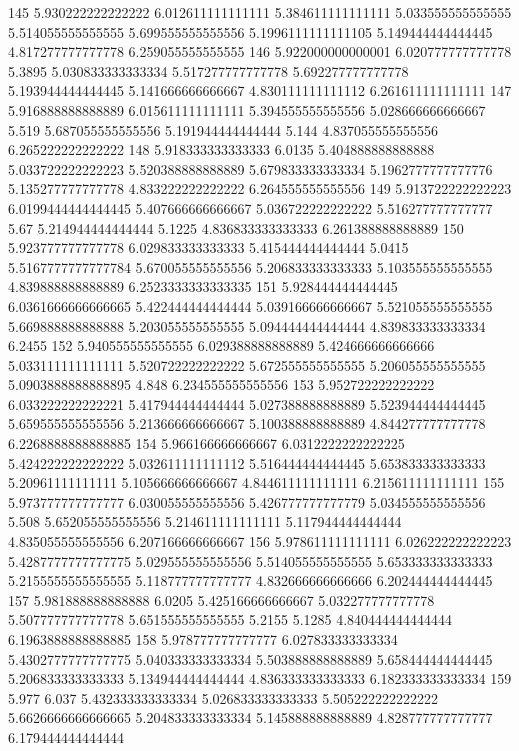 145 5.930222222222222 6.012611111111111 5.384611111111111 5.033555555555555 5.514055555555555 5.699555555555556 5.1996111111111105 5.149444444444445 4.817277777777778 6.259055555555555
146 5.922000000000001 6.020777777777778 5.3895 5.030833333333334 5.517277777777778 5.692277777777778 5.193944444444445 5.141666666666667 4.830111111111112 6.261611111111111
147 5.916888888888889 6.015611111111111 5.394555555555556 5.028666666666667 5.519 5.687055555555556 5.191944444444444 5.144 4.837055555555556 6.265222222222222
148 5.918333333333333 6.0135 5.404888888888888 5.033722222222223 5.520388888888889 5.679833333333334 5.1962777777777776 5.135277777777778 4.833222222222222 6.264555555555556
149 5.913722222222223 6.0199444444444445 5.407666666666667 5.036722222222222 5.516277777777777 5.67 5.214944444444444 5.1225 4.836833333333333 6.261388888888889
150 5.923777777777778 6.029833333333333 5.415444444444444 5.0415 5.5167777777777784 5.670055555555556 5.206833333333333 5.103555555555555 4.839888888888889 6.2523333333333335
151 5.928444444444445 6.0361666666666665 5.422444444444444 5.039166666666667 5.521055555555555 5.669888888888888 5.203055555555555 5.094444444444444 4.839833333333334 6.2455
152 5.940555555555555 6.029388888888889 5.424666666666666 5.033111111111111 5.520722222222222 5.672555555555555 5.206055555555555 5.0903888888888895 4.848 6.234555555555556
153 5.952722222222222 6.033222222222221 5.417944444444444 5.027388888888889 5.523944444444445 5.659555555555556 5.213666666666667 5.100388888888889 4.844277777777778 6.2268888888888885
154 5.966166666666667 6.0312222222222225 5.424222222222222 5.032611111111112 5.516444444444445 5.653833333333333 5.20961111111111 5.105666666666667 4.844611111111111 6.215611111111111
155 5.973777777777777 6.030055555555556 5.426777777777779 5.034555555555556 5.508 5.652055555555556 5.214611111111111 5.117944444444444 4.835055555555556 6.207166666666667
156 5.978611111111111 6.026222222222223 5.4287777777777775 5.029555555555556 5.514055555555555 5.653333333333333 5.2155555555555555 5.118777777777777 4.832666666666666 6.202444444444445
157 5.981888888888888 6.0205 5.425166666666667 5.032277777777778 5.507777777777778 5.651555555555555 5.2155 5.1285 4.840444444444444 6.1963888888888885
158 5.978777777777777 6.027833333333334 5.4302777777777775 5.040333333333334 5.503888888888889 5.658444444444445 5.206833333333333 5.134944444444444 4.836333333333333 6.182333333333334
159 5.977 6.037 5.432333333333334 5.026833333333333 5.505222222222222 5.6626666666666665 5.204833333333334 5.145888888888889 4.828777777777777 6.179444444444444
